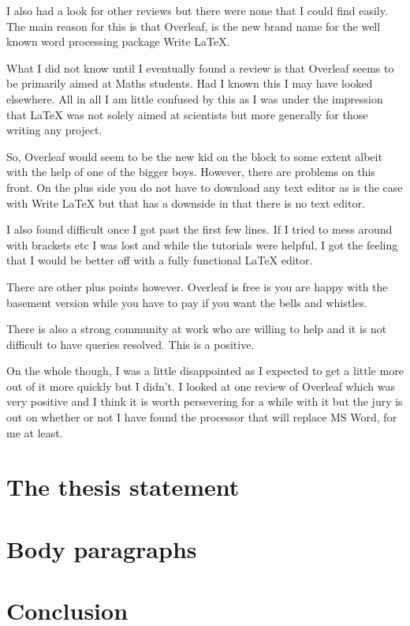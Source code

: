 \documentclass[paper=a4, fontsize=11pt]{scrartcl} %
\numberwithin{equation}{section} %
\numberwithin{figure}{section} %
\numberwithin{table}{section} %
\begin{document}
I also had a look for other reviews but there were none that I could find easily. The main reason for this is that Overleaf, is the new brand name for the well known word processing package Write LaTeX.



What I did not know until I eventually found a review is that Overleaf seems to be primarily aimed at Maths students. Had I known this I may have looked elsewhere. All in all I am little confused by this as I was under the impression that LaTeX was not solely aimed at scientists but more generally for those writing any project.





So, Overleaf would seem to be the new kid on the block to some extent albeit with the help of one of the bigger boys. However, there are problems on this front. On the plus side you do not have to download any text editor as is the case with Write LaTeX but that has a downside in that there is no text editor.



I also found difficult once I got past the first few lines. If I tried to mess around with brackets etc I was lost and while the tutorials were helpful, I got the feeling that I would be better off with a fully functional LaTeX editor.



There are other plus points however. Overleaf is free is you are happy with the basement version while you have to pay if you want the bells and whistles. 



There is also a strong community at work who are willing to help and it is not difficult to have queries resolved. This is a positive. 



On the whole though, I was a little disappointed as I expected to get a little more out of it more quickly but I didn't. I looked at one review of Overleaf which was very positive and I think it is worth persevering for a while with it but the jury is out on whether or not I have found the processor that will replace MS Word, for me at least. 





\section{The thesis statement}





\section{Body paragraphs}



\section{Conclusion}







\end{document}
